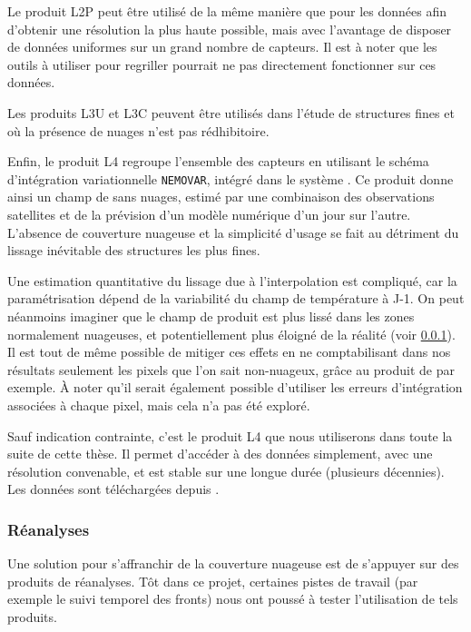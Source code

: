 \documentclass[index]{subfiles}
\begin{document}
Le produit L2P peut être utilisé de la même manière que pour les données  afin d'obtenir une résolution la plus haute possible, mais avec l'avantage de disposer de données uniformes sur un grand nombre de capteurs.
Il est à noter que les outils à utiliser pour regriller pourrait ne pas directement fonctionner sur ces données.

Les produits L3U et L3C peuvent être utilisés dans l'étude de structures fines et où la présence de nuages n'est pas rédhibitoire.

Enfin, le produit L4 regroupe l'ensemble des capteurs en utilisant le schéma d'intégration variationnelle \verb|NEMOVAR|, intégré dans le système  \parencite{good_2020}.
Ce produit donne ainsi un champ de  sans nuages, estimé par une combinaison des observations satellites et de la prévision d'un modèle numérique d'un jour sur l'autre.
L'absence de couverture nuageuse et la simplicité d'usage se fait au détriment du lissage inévitable des structures les plus fines.

Une estimation quantitative du lissage due à l'interpolation est compliqué, car la paramétrisation dépend de la variabilité du champ de température à J-1.
On peut néanmoins imaginer que le champ de  produit est plus lissé dans les zones normalement nuageuses, et potentiellement plus éloigné de la réalité (voir \cref{sec:donnees-sst-reanalyses}).
Il est tout de même possible de mitiger ces effets en ne comptabilisant dans nos résultats seulement les pixels que l'on sait non-nuageux, grâce au produit de  par exemple.
À noter qu'il serait également possible d'utiliser les erreurs d'intégration associées à chaque pixel, mais cela n'a pas été exploré.

Sauf indication contrainte, c'est le produit L4 que nous utiliserons dans toute la suite de cette thèse.
Il permet d'accéder à des données  simplement, avec une résolution convenable, et est stable sur une longue durée (plusieurs décennies).
Les données sont téléchargées depuis .

\subsubsection{Réanalyses}
\label{sec:donnees-sst-reanalyses}

Une solution pour s'affranchir de la couverture nuageuse est de s'appuyer sur des produits de réanalyses.
Tôt dans ce projet, certaines pistes de travail (par exemple le suivi temporel des fronts) nous ont poussé à tester l'utilisation de tels produits.
\end{document}
